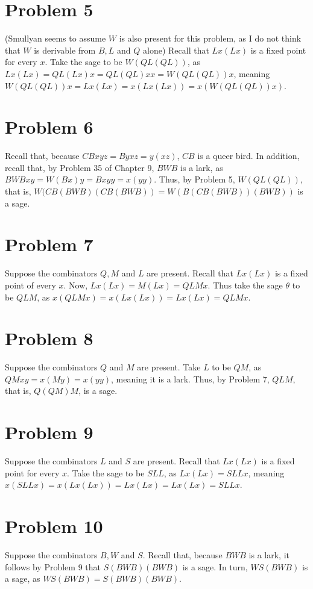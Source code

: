 \documentclass{article}
\theoremstyle{definition}
\begin{document}
\section*{Problem 5}
(Smullyan seems to assume $W$ is also present for this problem, as I do not think that $W$ is derivable from $B,L$ and $Q$ alone) Recall that $Lx(Lx)$ is a fixed point for every $x$. Take the sage to be $W(QL(QL))$, as 
$Lx(Lx)=QL(Lx)x=QL(QL)xx=W(QL(QL))x$, meaning $W(QL(QL))x=Lx(Lx)=x(Lx(Lx))=x(W(QL(QL))x)$.

\section*{Problem 6}
Recall that, because $CBxyz=Byxz=y(xz)$, $CB$ is a queer bird. In addition, recall that, by Problem 35 of Chapter 9, 
$BWB$ is a lark, as $BWBxy=W(Bx)y=Bxyy=x(yy)$. Thus, by Problem 5, $W(QL(QL))$, that is, $W(CB(BWB)(CB(BWB))=W(B(CB(BWB))(BWB))$ is a sage. 

\section*{Problem 7}
Suppose the combinators $Q,M$ and $L$ are present. Recall that $Lx(Lx)$ is a fixed point of every $x$. Now,
$Lx(Lx)=M(Lx)=QLMx$. Thus take the sage $\theta$ to be $QLM$, as
$x(QLMx)=x(Lx(Lx))=Lx(Lx)=QLMx$.

\section*{Problem 8}
Suppose the combinators $Q$ and $M$ are present. Take $L$ to be $QM$, as $QMxy=x(My)=x(yy)$, meaning it is a lark. Thus, by Problem 7, 
$QLM$, that is, $Q(QM)M$, is a sage.

\section*{Problem 9}
Suppose the combinators $L$ and $S$ are present. Recall that $Lx(Lx)$ is a fixed point for every $x$. Take the sage to be 
$SLL$, as $Lx(Lx)=SLLx$, meaning $x(SLLx)=x(Lx(Lx))=Lx(Lx)=Lx(Lx)=SLLx$.

\section*{Problem 10}
Suppose the combinators $B,W$ and $S$. Recall that, because $BWB$ is a lark, it follows by Problem 9 that 
$S(BWB)(BWB)$ is a sage. In turn, $WS(BWB)$ is a sage, as $WS(BWB)=S(BWB)(BWB)$.
\end{document}
